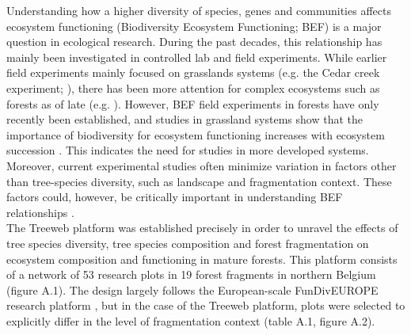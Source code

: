 \documentclass[10pt, twoside]{book} %
\begin{document}
Understanding how a higher diversity of species, genes and communities affects ecosystem functioning (Biodiversity Ecosystem Functioning; BEF) is a major question in ecological research. During the past decades, this relationship has mainly been investigated in controlled lab and field experiments. While earlier field experiments mainly focused on grasslands systems (e.g. the Cedar creek experiment; \citealt{Tilman2006}), there has been more attention for complex ecosystems such as forests as of late (e.g. \citealt{Paquette2018}). However, BEF field experiments in forests have only recently been established, and studies in grassland systems show that the importance of biodiversity for ecosystem functioning increases with ecosystem succession \citep{Meyer2016}. This indicates the need for studies in more developed systems. Moreover, current experimental studies often minimize variation in factors other than tree-species diversity, such as landscape and fragmentation context. These factors could, however, be critically important in understanding BEF relationships \citep{DeLaender2016, Liu2018}.\\

The Treeweb platform was established precisely in order to unravel the effects of tree species diversity, tree species composition and forest fragmentation on ecosystem composition and functioning in mature forests. This platform consists of a network of 53 research plots in 19 forest fragments in northern Belgium (figure A.1). The design largely follows the European-scale FunDivEUROPE research platform \citep{Baeten2013}, but in the case of the Treeweb platform, plots were selected to explicitly differ in the level of fragmentation context (table A.1, figure A.2).\\
\end{document}

